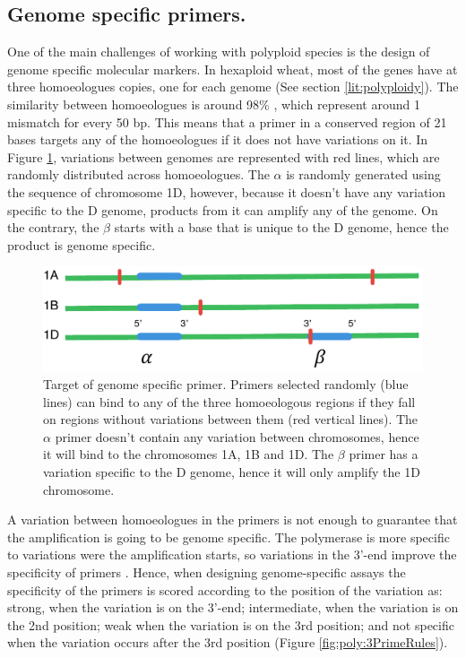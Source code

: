 \subsection{Genome specific primers.}
\label{sub:poly:genome-specific}
One of the main challenges of working with polyploid species is the design of genome specific molecular markers. 
In hexaploid wheat, most of the genes have at three homoeologues copies, one for each genome (See section \ref{lit:polyploidy}). 
The similarity between homoeologues is around 98\% \citep{Krasileva2013}, which represent around 1 mismatch for every 50 bp. 
This means that a primer in a conserved region of 21 bases targets any of the homoeologues if it does not have variations on it.
In Figure \ref{fig:poly:pimerChrSpecificDiagram}, variations between genomes are represented with red lines, which are randomly distributed across homoeologues. 
The $\alpha$ is randomly generated using the sequence of chromosome 1D, however, because it doesn't have any variation specific to the D genome, products from it can amplify any of the genome. 
On the contrary, the $\beta$ starts with a base that is unique to the D genome, hence the product is genome specific. 

\begin{figure}
\includegraphics[width=1\textwidth]{PolyMarker/Figures/intro/primerChrSpecificDiagram.pdf}
\caption[Target of genome specific primer.]{Target of genome specific primer. Primers selected randomly (blue lines) can bind to any of the three homoeologous regions if they fall on regions without variations between them (red vertical lines). The $\alpha$ primer doesn't contain any variation between chromosomes, hence it will bind to the chromosomes 1A, 1B and 1D. The $\beta$ primer has a variation specific to the D genome, hence it will only amplify the 1D chromosome.}
\label{fig:poly:pimerChrSpecificDiagram}
\end{figure}

A variation between homoeologues in the primers is not enough to guarantee that the amplification is going to be genome specific. 
The polymerase is more specific to variations were the amplification starts, so variations in the 3'-end improve the specificity of primers \citep{Huang2010}. 
Hence, when designing genome-specific assays the specificity of the primers is scored according to the position of the variation as:  strong, when the variation is on the 3'-end; intermediate, when the variation is on the 2nd position; weak when the variation is on the 3rd position; and not specific when the variation occurs after the 3rd position (Figure \ref{fig:poly:3PrimeRules}).  

